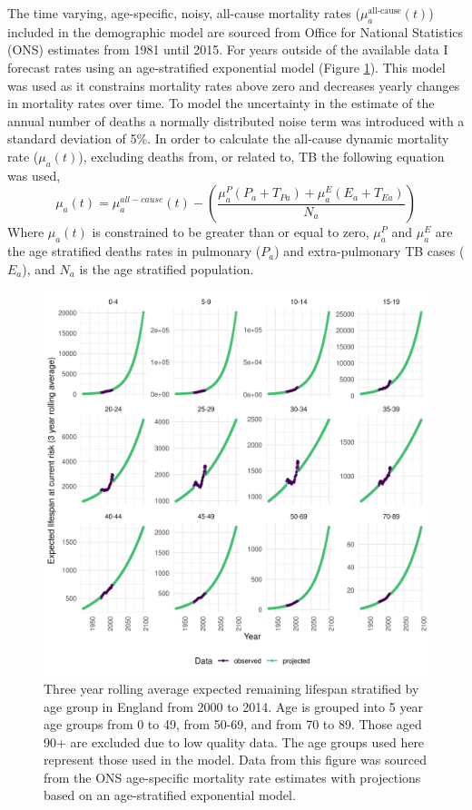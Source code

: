 \documentclass[11pt,twoside]{bristolthesis}
\begin{document}
  The time varying, age-specific, noisy, all-cause mortality rates (\(\mu^{\text{all-cause}}_a(t)\)) included in the demographic model are sourced from Office for National Statistics (ONS) estimates from 1981 until 2015. For years outside of the available data I forecast rates using an age-stratified exponential model (Figure \ref{fig:mortality-england}). This model was used as it constrains mortality rates above zero and decreases yearly changes in mortality rates over time. To model the uncertainty in the estimate of the annual number of deaths a normally distributed noise term was introduced with a standard deviation of 5\%. In order to calculate the all-cause dynamic mortality rate (\(\mu_a(t)\)), excluding deaths from, or related to, TB the following equation was used,
  \begin{equation}
  \mu_a(t) = \mu^{all-cause}_a(t) - \left(\frac{\mu^P_a(P_a + T_{Pa}) + \mu^E_a(E_a + T_{Ea})}{N_a}\right)
    \label{eq:adjusted-mortality}
  \end{equation}
  Where \(\mu_a(t)\) is constrained to be greater than or equal to zero, \(\mu^{P}_a\) and \(\mu^E_a\) are the age stratified deaths rates in pulmonary (\(P_a\)) and extra-pulmonary TB cases (\(E_a\)), and \(N_a\) is the age stratified population.
  \begin{figure}
  
  {\centering \includegraphics[width=0.8\linewidth,]{chapters/model-development/resources/figure/mortality} 
  
  }
  
  \caption[Three year rolling average expected remaining lifespan stratified by age group in England from 2000 to 2014.]{Three year rolling average expected remaining lifespan stratified by age group in England from 2000 to 2014. Age is grouped into 5 year age groups from 0 to 49, from 50-69, and from 70 to 89. Those aged 90+ are excluded due to low quality data. The age groups used here represent those used in the model. Data from this figure was sourced from the ONS age-specific mortality rate estimates with projections based on an age-stratified exponential model.}\label{fig:mortality-england}
  \end{figure}
\end{document}
